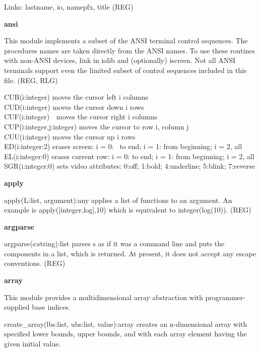 Links: lastname, io, namepfx, title (REG)

{\sffamily\bfseries
ansi }

This module implements a subset of the ANSI
terminal control sequences. The procedures{\textquotesingle} names are
taken directly from the ANSI names. To use these routines with non-ANSI
devices, link in \textsf{iolib} and (optionally) \textsf{iscreen}. Not
all ANSI terminals support even the limited subset of control sequences
included in this file. (REG, RLG)

\textsf{CUB(i:integer)} moves the cursor left i columns\\
\textsf{CUD(i:integer)} moves the cursor down i rows\\
\textsf{CUF(i:integer)}\ \ moves the cursor right i columns\\
\textsf{CUP(i:integer,j:integer)} moves the cursor to row i, column
j\\
\textsf{CUU(i:integer)} moves the cursor up i rows\\
\textsf{ED(i:integer:2)} erases screen: i = 0: \ to end; i
= 1: from beginning; i = 2, all\\
\textsf{EL(i:integer:0)} erases current row: i = 0: to end; i = 1: from
beginning; i = 2, all\\
\textsf{SGR(i:integer:0)} sets video attributes:
0:off; 1:bold; 4:underline; 5:blink; 7:reverse 

{\sffamily\bfseries
apply}

\textsf{apply(L:list, argument):any} applies a list of
functions to an argument. An example is
\textsf{apply([integer,log],10)} which is equivalent to
\textsf{integer(log(10))}. (REG)

{\sffamily\bfseries
argparse}

\textsf{argparse(s:string):list} parses \textsf{s} as if it was a
command line and puts the components in a list, which is returned. At
present, it does not accept any escape conventions. (REG)

{\sffamily\bfseries
array}

This module provides a multidimensional
array abstraction with programmer-supplied base indices.

\textsf{create\_array(lbs:list, ubs:list, value):array} creates an
n-dimensional array with specified lower bounds, upper bounds, and with
each array element having the given initial value.

